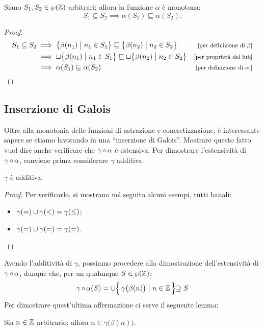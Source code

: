 \begin{teorema}
Siano $S_1, S_2 \in \wp(\mathbb{Z})$ arbitrari; allora la funzione $\alpha$
è monotona:
\[
  S_1 \subseteq S_2 \implies \alpha(S_1) \sqsubseteq \alpha(S_2).
\]
\end{teorema}
\begin{proof}
  \begin{align*}
    S_1 \subseteq S_2
      &\implies \bigl\{\beta(n_1) \bigm| n_1 \in S_1\bigr\}
        \sqsubseteq \bigl\{\beta(n_2) \bigm| n_2 \in S_2\bigr\}
      &\law{per definizione di $\beta$} \\
      &\implies \sqcup \bigl\{\beta(n_1) \bigm| n_1 \in S_1\bigr\}
        \sqsubseteq \sqcup \bigl\{\beta(n_2) \bigm| n_2 \in S_2\bigr\}
      &\law{per proprietà del $\lub$} \\
      &\implies \alpha(S_1) \sqsubseteq \alpha(S_2)
      &\law{per definizione di $\alpha$.}
  \end{align*}
\end{proof}

\subsection{Inserzione di Galois}

Oltre alla monotonia delle funzioni di astrazione e concretizzazione,
è interessante sapere se stiamo lavorando in una
``inserzione di Galois''.
Mostrare questo fatto vuol dire anche verificare che
$\mathrm{\gamma}\mathop{\circ}\mathrm{\alpha}$ è estensiva. 
Per dimostrare l'estensività di $\mathrm{\gamma}\mathop{\circ}\mathrm{\alpha}$, conviene
prima considerare $\gamma$ additiva.
\begin{proposizione}
$\gamma$ è additiva.
\end{proposizione}
\begin{proof}
Per verificarlo, si mostrano nel seguito alcuni esempi, tutti banali:
\begin{itemize}
  \item $\gamma(=) \cup \gamma(<) = \gamma(\leq)$;
  \item $\gamma(=) \cup \gamma(=) = \gamma(=)$.
\end{itemize}
\end{proof}
Avendo l'additività di $\gamma$, possiamo procedere alla dimostrazione
dell'estensività di $\mathrm{\gamma}\mathop{\circ}\mathrm{\alpha}$, dunque che,
per un qualunque $S \in \wp(\mathbb{Z})$:
\[
  \mathrm{\gamma}\mathop{\circ}\mathrm{\alpha}(S) = \cup \Bigl\{\, \gamma\bigl(\beta(n)\bigr) \bigm| n \in \mathbb{Z} \,\Bigl\} \supseteq S
\]
Per dimostrare quest'ultima affermazione ci serve il seguente lemma:
\begin{lemma}
  Sia $n \in \mathbb{Z}$ arbitrario; allora
  $n \in \gamma\bigl(\beta(n)\bigr)$.
\end{lemma}

